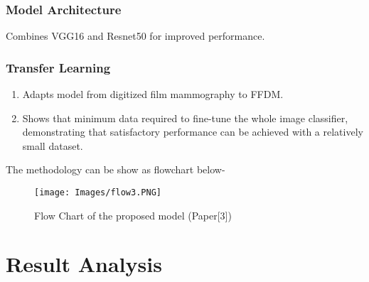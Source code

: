 \documentclass[12]{article}
\begin{document}
\subsubsection{Model Architecture}

Combines VGG16 and Resnet50 for improved performance.

\subsubsection{Transfer Learning}

\begin{enumerate}
    \item Adapts model from digitized film mammography to FFDM.
    \item Shows that minimum data required to fine-tune the whole image classifier, demonstrating that satisfactory performance can be achieved with a relatively small dataset.
\end{enumerate}

\newpage
The methodology can be show as flowchart below-
\begin{figure}[hbt!]
    \centering
    \texttt{[image: Images/flow3.PNG]}
    \caption{Flow Chart of the proposed model (Paper[3])}
    \label{diagram4}
\end{figure}

\section{Result Analysis}
\end{document}
